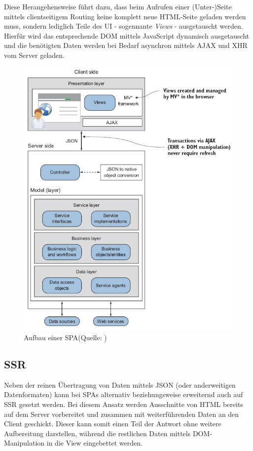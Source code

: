 \documentclass[a4paper,12pt,twoside]{scrreprt}
\begin{document}
\medskip

Diese Herangehensweise führt dazu, dass beim Aufrufen einer (Unter-)Seite mittels clientseitigem Routing keine komplett neue HTML-Seite geladen werden muss, sondern lediglich Teile des \acl{UI} - sogennante \textit{Views} - ausgetauscht werden. Hierfür wird das entsprechende \ac{DOM} mittels JavaScript dynamisch ausgetauscht und die benötigten Daten werden bei Bedarf asynchron mittels \acs{AJAX} und XHR vom Server geladen. \parencite[][Seite 7]{scott_spa_2015}

\begin{figure}[ht]
    \centering
    \includegraphics[scale=0.60]{images/Scott_SPA-overview.png}
    \caption[Aufbau einer \acs{SPA}]{Aufbau einer \acs{SPA}\newline(Quelle: \cite[][Seite 6]{scott_spa_2015})}
    \label{fig:spa-overview}
\end{figure}

\subsection{\acl{SSR}}
\label{subsec:ssr}
Neben der reinen Übertragung von Daten mittels \acs{JSON} (oder anderweitigen Datenformaten) kann bei \acsp{SPA} alternativ beziehungsweise erweiternd auch auf \ac{SSR} gesetzt werden. Bei diesem Ansatz werden Ausschnitte von HTML bereits auf dem Server vorbereitet und zusammen mit weiterführenden Daten an den Client geschickt. Dieser kann somit einen Teil der Antwort ohne weitere Aufbereitung darstellen, während die restlichen Daten mittels \ac{DOM}-Manipulation in die View eingebettet werden. \parencite[][Seite 7]{scott_spa_2015}
\end{document}
